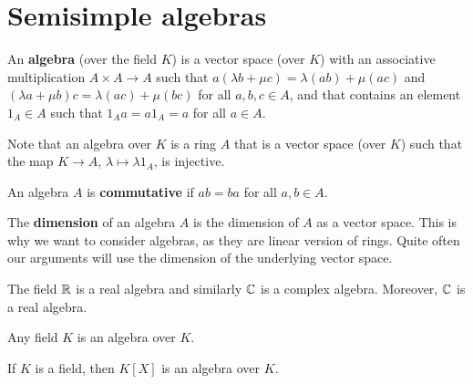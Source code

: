 \chapter{Semisimple algebras}



\begin{definition}
	An \textbf{algebra} (over the field $K$) is a vector space (over $K$) 
	with an associative multiplication $A\times A\to A$ such that
	$a(\lambda b+\mu c)=\lambda(ab)+\mu(ac)$ and
	$(\lambda a+\mu b)c=\lambda(ac)+\mu (bc)$ for all $a,b,c\in A$, and 
	that contains an element $1_A\in A$ such that $1_Aa=a1_A=a$ for all $a\in A$.   
\end{definition}

Note that an algebra over $K$ is a ring $A$ that is a vector space
(over $K$) such that the map $K\to A$, $\lambda\mapsto \lambda1_A$, is injective. 

\begin{definition}
An algebra $A$ is \textbf{commutative} if $ab=ba$ for all $a,b\in A$. 
\end{definition}

The \textbf{dimension} of an algebra $A$ is the dimension of $A$ as a vector space. This is why we want to consider algebras, as 
they are linear version of rings. Quite often our arguments will use the dimension of the underlying vector space.  

\begin{example}
	The field $\mathbb{R}$ is a real algebra and similarly 
	$\mathbb{C}$ is a complex algebra. Moreover, $\mathbb{C}$ is a real algebra. 
\end{example}

Any field $K$ is an algebra over $K$.

\begin{example}
	If $K$ is a field, then $K[X]$ is an algebra over $K$. 
\end{example}

